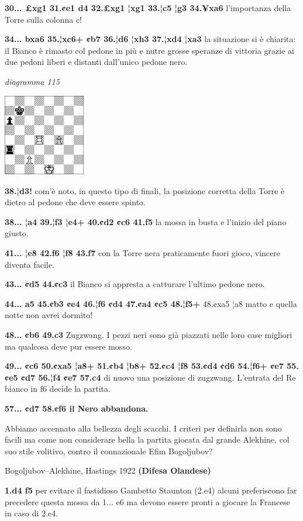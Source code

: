 \documentclass[
]{article}
\begin{document}
\textbf{30... £xg1 31.¢e1 d4 32.£xg1 ¦xg1 33.¦c5 ¦g3 34.¥xa6}
l'importanza della Torre sulla colonna c!

\textbf{34... bxa6 35.¦xc6+ ¢b7 36.¦d6 ¦xh3 37.¦xd4 ¦xa3} la situazione
si è chiarita: il Bianco è rimasto col pedone in più e nutre grosse
speranze di vittoria grazie ai due pedoni liberi e distanti dall'unico
pedone nero.

\emph{diagramma 115}

\includegraphics[width=1.40139in,height=1.40139in]{vertopal_109f12be458a423d8f3cc838880eaea2/media/image115.png}

\textbf{38.¦d3!} com'è noto, in questo tipo di finali, la posizione
corretta della Torre è dietro al pedone che deve essere spinto.

\textbf{38... ¦a4 39.¦f3 ¦e4+ 40.¢d2 ¢c6 41.f5} la mossa in busta e
l'inizio del piano giusto.

\textbf{41... ¦e8 42.f6 ¦f8 43.f7} con la Torre nera praticamente fuori
gioco, vincere diventa facile.

\textbf{43... ¢d5 44.¢c3} il Bianco si appresta a catturare l'ultimo
pedone nero.

\textbf{44... a5 45.¢b3 ¢e4 46.¦f6 ¢d4 47.¢a4 ¢c5 48.¦f5+} 48.¢xa5 ¦a8
matto e quella notte non avrei dormito!

\textbf{48... ¢b6 49.c3} Zugzwang. I pezzi neri sono già piazzati nelle
loro case migliori ma qualcosa deve pur essere mosso.

\textbf{49... ¢c6 50.¢xa5 ¦a8+ 51.¢b4 ¦b8+ 52.¢c4 ¦f8 53.¢d4 ¢d6 54.¦f6+
¢e7 55.¢e5 ¢d7 56.¦f4 ¢e7 57.c4} di nuovo una posizione di zugzwang.
L'entrata del Re bianco in f6 decide la partita.

\textbf{57... ¢d7 58.¢f6 il Nero abbandona.}

Abbiamo accennato alla bellezza degli scacchi. I criteri per definirla
non sono facili ma come non considerare bella la partita giocata dal
grande Alekhine, col suo stile volitivo, contro il connazionale Efim
Bogoljubov?

Bogoljubov--Alekhine, Hastings 1922 \textbf{(Difesa Olandese)}

\textbf{1.d4 f5} per evitare il fastidioso Gambetto Staunton (2.e4)
alcuni preferiscono far precedere questa mossa da 1... e6 ma devono
essere pronti a giocare la Francese in caso di 2.e4.
\end{document}

